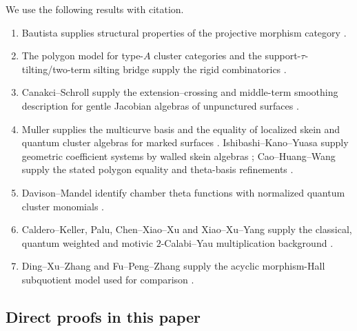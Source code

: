 We use the following results with citation.
\begin{enumerate}[label=(\roman*),leftmargin=2.4em]
\item Bautista supplies structural properties of the projective morphism
      category \cite{Bautista}.
\item The polygon model for type-$A$ cluster categories and the
      support-$\tau$-tilting/two-term silting bridge supply the rigid
      combinatorics \cite{BMRRT,AIR}.
\item Canakci--Schroll supply the extension--crossing and middle-term
      smoothing description for gentle Jacobian algebras of unpunctured
      surfaces \cite{CanakciSchroll}.
\item Muller supplies the multicurve basis and the equality of localized skein
      and quantum cluster algebras for marked surfaces \cite{Muller}.
      Ishibashi--Kano--Yuasa supply geometric coefficient systems by walled
      skein algebras \cite{IshibashiKanoYuasa}; Cao--Huang--Wang supply the
      stated polygon equality and theta-basis refinements
      \cite{CaoHuangWang}.
\item Davison--Mandel identify chamber theta functions with normalized quantum
      cluster monomials \cite{DavisonMandel}.
\item Caldero--Keller, Palu, Chen--Xiao--Xu and Xiao--Xu--Yang supply the
      classical, quantum weighted and motivic $2$-Calabi--Yau multiplication
      background \cite{CalderoKeller,PaluMultiplication,ChenXiaoXu,XiaoXuYang}.
\item Ding--Xu--Zhang and Fu--Peng--Zhang supply the acyclic morphism-Hall
      subquotient model used for comparison
      \cite{DingXuZhang,FuPengZhang}.
\end{enumerate}

\subsection{Direct proofs in this paper}

